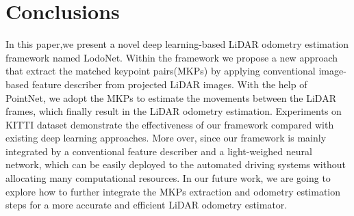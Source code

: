 \documentclass[sigconf]{acmart}
\def\lodo{LodoNet}
\begin{document}
\section{Conclusions}
In this paper,we present a novel deep learning-based LiDAR odometry estimation framework named LodoNet. Within the framework we propose a new approach that extract the matched keypoint pairs(MKPs) by applying conventional image-based feature describer from projected LiDAR images. With the help of PointNet, we adopt the MKPs to estimate the movements between the LiDAR frames, which finally result in the LiDAR odometry estimation. Experiments on KITTI dataset demonstrate the effectiveness of our framework compared with existing deep learning approaches. More over, since our framework is mainly integrated by a conventional feature describer and a light-weighed neural network, which can be easily deployed to the automated driving systems without allocating many computational resources. In our future work, we are going to explore how to further integrate the MKPs extraction and odometry estimation steps for a more accurate and efficient LiDAR odometry estimator.


\newpage



\end{document}
